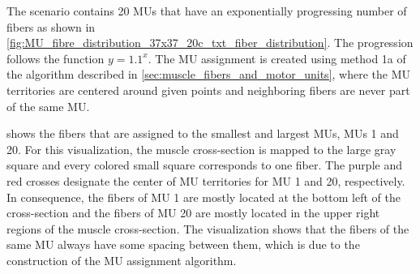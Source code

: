 The scenario contains 20 MUs that have an exponentially progressing number of fibers as shown in \cref{fig:MU_fibre_distribution_37x37_20c_txt_fiber_distribution}. The progression follows the function $y=1.1^x$.
The MU assignment is created using method 1a of the algorithm described in \cref{sec:muscle_fibers_and_motor_units}, where the MU territories are centered around given points and neighboring fibers are never part of the same MU. 

 shows the fibers that are assigned to the smallest and largest MUs, MUs 1 and 20. For this visualization, the muscle cross-section is mapped to the large gray square and every colored small square corresponds to one fiber. The purple and red crosses designate the center of MU territories for MU 1 and 20, respectively. In consequence, the fibers of MU 1 are mostly located at the bottom left of the cross-section and the fibers of MU 20 are mostly located in the upper right regions of the muscle cross-section.
The visualization shows that the fibers of the same MU always have some spacing between them, which is due to the construction of the MU assignment algorithm.

